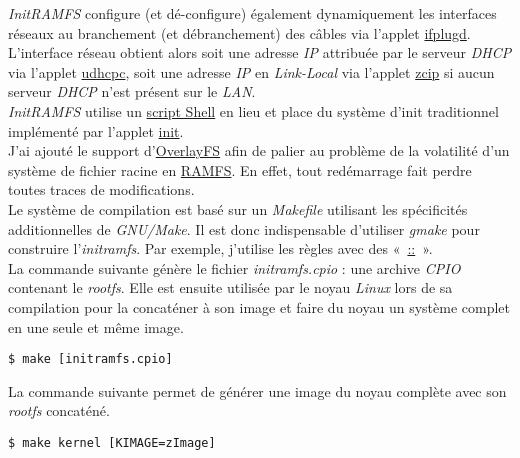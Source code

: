 \documentclass[a4paper]{article}
\begin{document}
\textit{InitRAMFS} configure (et dé-configure) également dynamiquement les interfaces réseaux au branchement (et débranchement) des câbles via l'applet \href{http://www.busybox.net/downloads/BusyBox.html#ifplugd}{ifplugd}. L'interface réseau obtient alors soit une adresse \textit{IP} attribuée par le serveur \textit{DHCP} via l'applet \href{http://www.busybox.net/downloads/BusyBox.html#udhcpc}{udhcpc}, soit une adresse \textit{IP} en \textit{Link-Local} via l'applet \href{http://www.busybox.net/downloads/BusyBox.html#zcip}{zcip} si aucun serveur \textit{DHCP} n'est présent sur le \textit{LAN}.\\

\textit{InitRAMFS} utilise un \href{https://github.com/gazoo74/initramfs/blob/master/packages-initramfs/ramfs/etc/init}{script Shell} en lieu et place du système d'init traditionnel implémenté par l'applet \href{http://www.busybox.net/downloads/BusyBox.html#init}{init}.\\

J'ai ajouté le support d'\href{https://www.kernel.org/doc/Documentation/filesystems/overlayfs.txt}{OverlayFS} afin de palier au problème de la volatilité d'un système de fichier racine en \href{https://fr.wikipedia.org/wiki/Ramfs}{RAMFS}. En effet, tout redémarrage fait perdre toutes traces de modifications.\\

Le système de compilation est basé sur un \textit{Makefile} utilisant les spécificités additionnelles de \textit{GNU/Make}. Il est donc indispensable d'utiliser \textit{gmake} pour construire l'\textit{initramfs}. Par exemple, j'utilise les règles avec des «~\href{https://www.gnu.org/software/make/manual/html_node/Double_002dColon.html}{::}~».\\

La commande suivante génère le fichier \textit{initramfs.cpio} : une archive \textit{CPIO} contenant le \textit{rootfs}. Elle est ensuite utilisée par le noyau \textit{Linux} lors de sa compilation pour la concaténer à son image et faire du noyau un système complet en une seule et même image.

\begin{verbatim}
$ make [initramfs.cpio]
\end{verbatim}

La commande suivante permet de générer une image du noyau complète avec son \textit{rootfs} concaténé.

\begin{verbatim}
$ make kernel [KIMAGE=zImage]
\end{verbatim}
\end{document}
